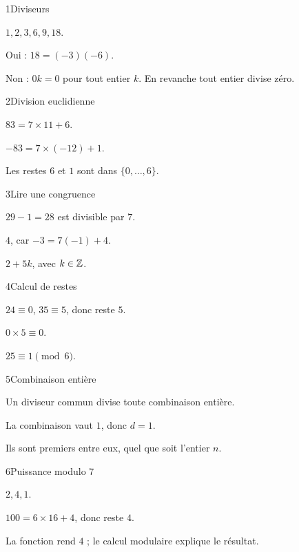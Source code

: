 \begin{corrige}{1}{Diviseurs}
\begin{questions}
\item $1,2,3,6,9,18$.
\item Oui : $18=(-3)(-6)$.
\item Non : $0k=0$ pour tout entier $k$. En revanche tout entier divise zéro.
\end{questions}
\end{corrige}
\begin{corrige}{2}{Division euclidienne}
\begin{questions}
\item $83=7\times11+6$.
\item $-83=7\times(-12)+1$.
\item Les restes $6$ et $1$ sont dans $\{0,\ldots,6\}$.
\end{questions}
\end{corrige}
\begin{corrige}{3}{Lire une congruence}
\begin{questions}
\item $29-1=28$ est divisible par $7$.
\item $4$, car $-3=7(-1)+4$.
\item $2+5k$, avec $k\in\mathbb{Z}$.
\end{questions}
\end{corrige}
\begin{corrige}{4}{Calcul de restes}
\begin{questions}
\item $24\equiv0$, $35\equiv5$, donc reste $5$.
\item $0\times5\equiv0$.
\item $25\equiv1\pmod6$.
\end{questions}
\end{corrige}
\begin{corrige}{5}{Combinaison entière}
\begin{questions}
\item Un diviseur commun divise toute combinaison entière.
\item La combinaison vaut $1$, donc $d=1$.
\item Ils sont premiers entre eux, quel que soit l’entier $n$.
\end{questions}
\end{corrige}
\begin{corrige}{6}{Puissance modulo $7$}
\begin{questions}
\item $2,4,1$.
\item $100=6\times16+4$, donc reste $4$.
\item La fonction rend $4$ ; le calcul modulaire explique le résultat.
\end{questions}
\end{corrige}
